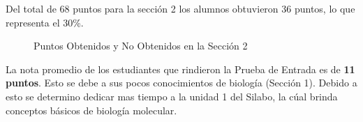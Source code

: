 \documentclass[11pt,fleqn]{book} %
\begin{document}
Del total de 68 puntos para la sección 2 los alumnos obtuvieron 36 puntos, lo que representa el 30\%.

\begin{figure}[h]
\centering
{}
\caption{Puntos Obtenidos y No Obtenidos en la Sección 2}
\end{figure}

La nota promedio de los estudiantes que rindieron la Prueba de Entrada es de \textbf{11 puntos}. Esto se debe a sus pocos conocimientos de biología (Sección 1). Debido a esto se determino dedicar mas tiempo a la unidad 1 del Silabo, la cúal brinda conceptos básicos de biología molecular.
\end{document}
